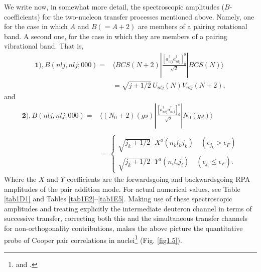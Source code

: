 We write now, in somewhat more detail, the spectroscopic amplitudes ($B$-coefficients) for the two-nucleon transfer processes mentioned above. Namely, one for the case in which $A$ and $B(=A+2)$ are members of a pairing rotational band. A second one, for the case in which they are members of a pairing vibrational band. That is, 
\begin{equation}\label{eqC21.8}
\begin{split}
\mathbf{1)}, B(nlj,nlj;000)=&\langle BCS(N+2)|\frac{[a^\dagger_{nlj}a^\dagger_{nlj}]^0_0}{\sqrt{2}}|BCS(N)\rangle\\
&=\sqrt{j+1/2}\,U_{nlj}(N)V_{nlj}(N+2),
\end{split}
\end{equation}
and
\begin{equation}
\begin{split}
\mathbf{2)}, B(nlj,nlj;000)=&\langle (N_0+2)(gs)|\frac{[a^\dagger_{nlj}a^\dagger_{nlj}]^0_0}{\sqrt{2}}|N_0(gs)\rangle \\
&\\
&=\left\{\begin{array}{c}
\sqrt{j_k+1/2}\;\;X^a(n_kl_kj_k)\quad (\epsilon_{j_k}>\epsilon_F) \\ 
\sqrt{j_k+1/2}\;\;Y^a(n_il_ij_i)\quad (\epsilon_{j_i}\leq\epsilon_F).
\end{array} \right.
\end{split}
\end{equation}
Where the $X$ and $Y$ coefficients are the forwardsgoing and backwardsgoing RPA amplitudes of the pair addition mode.
For actual numerical values, see Table \ref{tab1D1} and  Tables \ref{tab1E2}--\ref{tab1E5}. Making use of these spectroscopic amplitudes and treating explicitly the intermediate deuteron channel in terms of successive transfer, correcting both this and the simultaneous transfer channels for non-orthogonality contributions, makes the above picture the quantitative probe of Cooper pair correlations in nuclei\footnote{\cite{Bayman:82} and \cite{Potel:13}.}  (Fig. \ref{fig1.5}).

